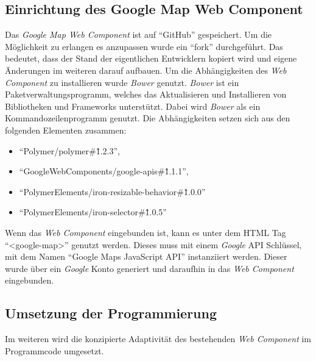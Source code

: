 \documentclass[12pt, paper=a4, bibtotoc, toc=listof, headsepline=true]{scrreprt}
\begin{document}
			\subsection{Einrichtung des Google Map Web Component}
			Das \emph{Google Map Web Component} ist auf \enquote{GitHub} gespeichert. Um die Möglichkeit zu erlangen es anzupassen wurde ein \enquote{fork} durchgeführt. Das bedeutet, dass der Stand der eigentlichen Entwicklern kopiert wird und eigene Änderungen im weiteren darauf aufbauen. Um die Abhängigkeiten des \emph{Web Component} zu installieren wurde \emph{Bower} genutzt. \emph{Bower} ist ein Paketverwaltungsprogramm, welches das Aktualisieren und Installieren von Bibliotheken und Frameworks unterstützt. Dabei wird \emph{Bower} als ein Kommandozeilenprogramm genutzt\cite{bower}. Die Abhängigkeiten setzen sich aus den folgenden Elementen zusammen:
			\begin{itemize}
				\item
				\enquote{Polymer/polymer\#\^1.2.3},
				\item
				\enquote{GoogleWebComponents/google-apis\#\^1.1.1},
				\item
				\enquote{PolymerElements/iron-resizable-behavior\#\^1.0.0}
				\item
				\enquote{PolymerElements/iron-selector\#\^1.0.5}
			\end{itemize}
			Wenn das \emph{Web Component} eingebunden ist, kann es unter dem \ac{HTML} Tag \enquote{<google-map>} genutzt werden. Dieses muss mit einem \emph{Google} \ac{API} Schlüssel, mit dem Namen \enquote{Google Maps JavaScript API} instanziiert werden. Dieser wurde über ein \emph{Google} Konto generiert und daraufhin in das \emph{Web Component} eingebunden. 
			\subsection{Umsetzung der Programmierung}
			Im weiteren wird die konzipierte Adaptivität des bestehenden \emph{Web Component} im Programmcode umgesetzt.
\end{document}
